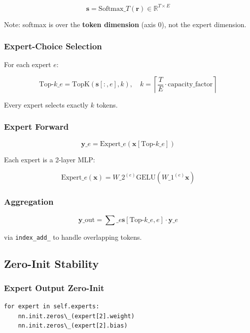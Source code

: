 \[
\mathbf{s} = \text{Softmax}\_T(\mathbf{r}) \in \mathbb{R}^{T \times E}
\tag{4.8}
\]

Note: softmax is over the \textbf{token dimension} (axis 0), not the expert 
dimension.

\subsubsection{Expert-Choice Selection}

For each expert $e$:

\[
\text{Top-}k\_e = \text{TopK}\!\left(\mathbf{s}[:, e], k\right), \quad
k = \left\lceil \frac{T}{E} \cdot \text{capacity\_factor} \right\rceil
\tag{4.9}
\]

Every expert selects exactly $k$ tokens.

\subsubsection{Expert Forward}

\[
\mathbf{y}\_e = \text{Expert}\_e\!\left(\mathbf{x}[\text{Top-}k\_e]\right)
\tag{4.10}
\]

Each expert is a 2-layer MLP:

\[
\text{Expert}\_e(\mathbf{x}) = W\_2^{(e)} \text{GELU}(W\_1^{(e)} \mathbf{x})
\tag{4.11}
\]

\subsubsection{Aggregation}

\[
\mathbf{y}\_{\text{out}} = \sum\_e \mathbf{s}[\text{Top-}k\_e, e] \cdot \mathbf{y}\_e
\tag{4.12}
\]

via \texttt{index\_add\_} to handle overlapping tokens.

\subsection{Zero-Init Stability}

\subsubsection{Expert Output Zero-Init}

\begin{lstlisting}
for expert in self.experts:
    nn.init.zeros\_(expert[2].weight)
    nn.init.zeros\_(expert[2].bias)
\end{lstlisting}

